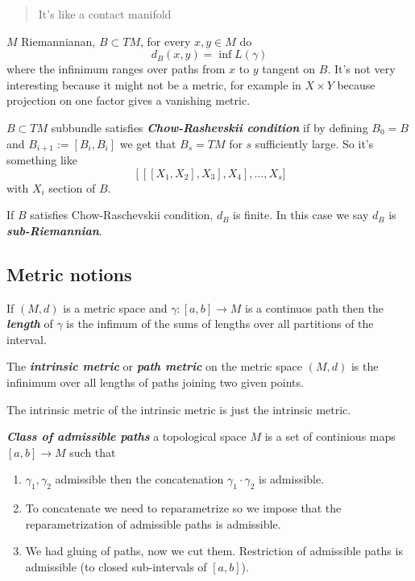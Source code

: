 {\color{4}\begin{quotation}
	It's like a contact manifold
\end{quotation}}

$M$ Riemannianan, $B \subset TM$, for every $x,y \in M$ do
\[d_B(x,y)=\operatorname{inf}L(\gamma)\]
where the infinimum ranges over paths from $x$ to $y$ tangent on $B$. It's not very interesting because it might not be a metric, for example in $X\times Y$ because projection on one factor gives a vanishing metric.

 \begin{defn}\leavevmode
	 $B \subset TM$ subbundle satisfies \textit{\textbf{Chow-Rashevskii condition}} if by defining $B_0=B$ and $B_{i+1}:=[B_i,B_i]$ we get that $B_s = TM$ for  $s$ sufficiently large. So it's something like
	 \[ [ [ [X_1,X_2],X_3],X_4],\ldots,X_s]\]
	with $X_i$ section of $B$.
\end{defn}

\begin{thm}\leavevmode
If $ B$ satisfies Chow-Raschevskii condition,  $d_B$ is finite. In this case we say $d_B$ is \textit{\textbf{sub-Riemannian}}.
\end{thm}

\subsection{Metric notions}
\begin{defn}\leavevmode
	If  $(M,d)$ is a metric space and $\gamma:[a,b]\to M$ is a continuos path then the \textit{\textbf{length}} of $\gamma$ is the infimum of the sums of lengths over all partitions of the interval.
\end{defn}

\begin{defn}\leavevmode
	The \textit{\textbf{intrinsic metric}} or \textit{\textbf{path metric}} on the metric space $(M,d)$ is the infinimum over all lengths of paths joining two given points.
\end{defn}

\begin{remark}\leavevmode
	The intrinsic metric of the intrinsic metric is just the intrinsic metric.
\end{remark}

\begin{defn}\leavevmode
	\textit{\textbf{Class of admissible paths}}  a topological space $M$ is a set of continious maps $[a,b] \to M$ such that
\begin{enumerate}
\item $\gamma_1,\gamma_2$ admissible then the concatenation $\gamma_1\cdot\gamma_2$ is admissible.
\item To concatenate we need to reparametrize so we impose that the reparametrization of admissible paths is admissible. 
\item We had gluing of paths, now we cut them. Restriction of admissible paths is admissible (to closed sub-intervals of $[a,b]$).
\end{enumerate}
\end{defn}

